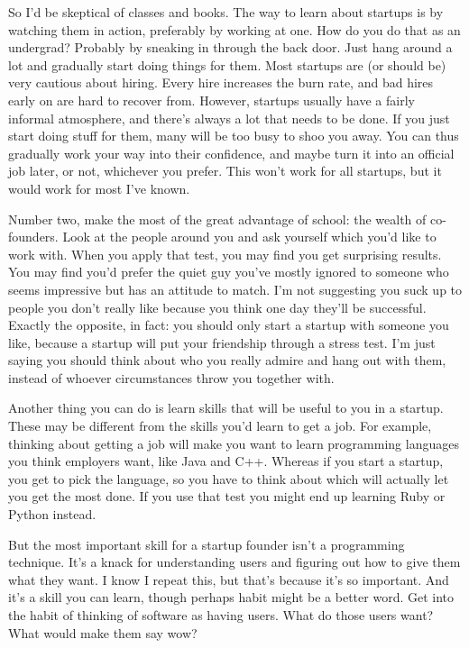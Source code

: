 So I'd be skeptical of classes and books. The way to learn about
startups is by watching them in action, preferably by working at one.
How do you do that as an undergrad? Probably by sneaking in through the
back door. Just hang around a lot and gradually start doing things for
them. Most startups are (or should be) very cautious about hiring. Every
hire increases the burn rate, and bad hires early on are hard to recover
from. However, startups usually have a fairly informal atmosphere, and
there's always a lot that needs to be done. If you just start doing
stuff for them, many will be too busy to shoo you away. You can thus
gradually work your way into their confidence, and maybe turn it into an
official job later, or not, whichever you prefer. This won't work for
all startups, but it would work for most I've known.

Number two, make the most of the great advantage of school: the wealth
of co-founders. Look at the people around you and ask yourself which
you'd like to work with. When you apply that test, you may find you get
surprising results. You may find you'd prefer the quiet guy you've
mostly ignored to someone who seems impressive but has an attitude to
match. I'm not suggesting you suck up to people you don't really like
because you think one day they'll be successful. Exactly the opposite,
in fact: you should only start a startup with someone you like, because
a startup will put your friendship through a stress test. I'm just
saying you should think about who you really admire and hang out with
them, instead of whoever circumstances throw you together with.

Another thing you can do is learn skills that will be useful to you in a
startup. These may be different from the skills you'd learn to get a
job. For example, thinking about getting a job will make you want to
learn programming languages you think employers want, like Java and C++.
Whereas if you start a startup, you get to pick the language, so you
have to think about which will actually let you get the most done. If
you use that test you might end up learning Ruby or Python instead.

But the most important skill for a startup founder isn't a programming
technique. It's a knack for understanding users and figuring out how to
give them what they want. I know I repeat this, but that's because it's
so important. And it's a skill you can learn, though perhaps habit might
be a better word. Get into the habit of thinking of software as having
users. What do those users want? What would make them say wow?

